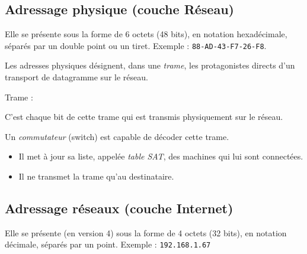 \subsection{Adressage physique (couche Réseau)}


Elle se présente sous la forme de 6 octets (48 bits), en notation hexadécimale, séparés par un double point ou un tiret. Exemple : \texttt{88-AD-43-F7-26-F8}.

\medskip

Les adresses physiques désignent, dans une \emph{trame}, les protagonistes directs d'un transport de datagramme sur le réseau.

Trame : 

C'est chaque bit de cette trame qui est transmis physiquement sur le réseau.

Un \emph{commutateur} (switch)  \raisebox{-1.5ex}{\tikz\node[scale=0.9]{\switch};} est capable de décoder cette trame.
\begin{itemize}
    \item Il met à jour sa liste, appelée \emph{table SAT}, des machines qui lui sont connectées.
    \item Il ne transmet la trame qu'au destinataire.
\end{itemize}


\subsection{Adressage réseaux (couche Internet)}

 
Elle se présente (en version 4) sous la forme de 4 octets (32 bits), en notation décimale, séparés par un  point. Exemple : \texttt{192.168.1.67}

\medskip

